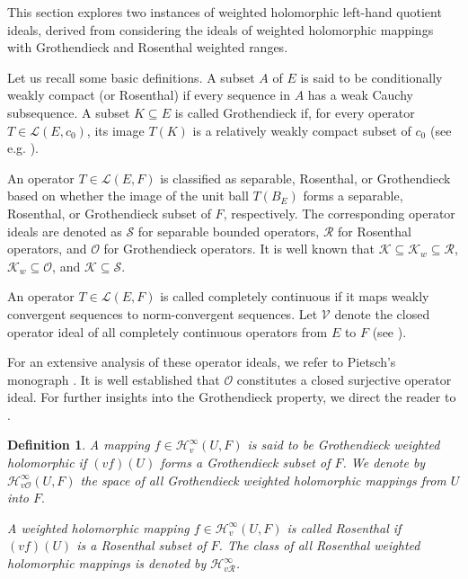 \documentclass[12pt]{amsart}
\theoremstyle{plain}
\newtheorem{definition}[theorem]{Definition}
\numberwithin{equation}{section}
\begin{document}
This section explores two instances of weighted holomorphic left-hand
quotient ideals, derived from considering the ideals of weighted holomorphic
mappings with Grothendieck and Rosenthal weighted ranges.  

Let us recall some basic definitions.
A subset $A$ of $E$ is said to be
conditionally weakly compact (or Rosenthal) if every sequence in $A$ has a
weak Cauchy subsequence. A subset $
K\subseteq E$ is called Grothendieck if, for every operator $T\in \mathcal{L}
\left( E,c_{0}\right) $, its image $T\left( K\right) $ is a relatively
weakly compact subset of $c_{0}$ (see e.g. \cite[p. 298]{Gonz2021}). 

An operator $T\in \mathcal{L}\left( E,F\right) $ is classified as separable,
Rosenthal, or Grothendieck based on whether the image of the unit ball $%
T\left( B_{E}\right) $ forms a 
separable, Rosenthal, or Grothendieck subset of $F$, respectively. The
corresponding operator ideals are denoted as  $\mathcal{S} $ for separable bounded operators, $%
\mathcal{R}$ for Rosenthal operators, and $\mathcal{O} $ for Grothendieck operators. It is well known that $\mathcal{K} \subseteq \mathcal{K}_w\subseteq \mathcal{R} $, $\mathcal{K}_w\subseteq \mathcal{O} $, and $\mathcal{K}\subseteq \mathcal{S}.$ 

An operator $T\in \mathcal{L}%
\left( E,F\right) $ is called completely continuous if it maps  weakly
convergent sequences  to  norm-convergent sequences. Let $\mathcal{V}$ denote the closed operator ideal of all
completely continuous operators from $E$ to $F$ (see \cite[1.6.2
and 4.2.5]{Pietsch1980}). 

For an extensive
analysis of these operator ideals, we refer to Pietsch's monograph \cite%
{Pietsch1980}.  It is well established that $\mathcal{O}$
constitutes a closed surjective operator ideal. For further insights into
the Grothendieck property, we direct the reader to \cite{Gonz2021}.

\begin{definition}
A mapping $f\in \mathcal{H}_{v}^{\infty }(U,F)$ is said to be Grothendieck
weighted holomorphic if  $(vf)\left( U\right) $ forms a Grothendieck
subset of $F$. We denote by $\mathcal{H}_{v\mathcal{O}}^{\infty }(U,F)$ the
space of all Grothendieck weighted holomorphic mappings from $U$ into $F.$

 A weighted holomorphic mapping $f\in \mathcal{H}_{v}^{\infty }(U,F)$ is called Rosenthal if $(vf)\left( U\right) $ is a Rosenthal subset of $F$. The class of all Rosenthal weighted holomorphic mappings is denoted by $\mathcal{H}_{v\mathcal{R}}^{\infty }$.
\end{definition}
\end{document}
